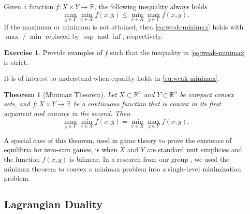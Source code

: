 \documentclass[
]{book}
\newtheorem{theorem}{Theorem}[chapter]
\theoremstyle{definition}
\theoremstyle{definition}
\theoremstyle{definition}
\newtheorem{exercise}{Exercise}[chapter]
\theoremstyle{definition}
\theoremstyle{remark}
\begin{document}
Given a function \(f: X \times Y \rightarrow \mathbb{R}^{}\), the following inequality always holds
\begin{equation}
\max_{y \in Y} \min_{x \in X} f(x,y) \leq \min_{x \in X} \max_{y \in Y} f(x,y).
\label{eq:weak-minimax}
\end{equation}
If the maximum or minimum is not attained, then \eqref{eq:weak-minimax} holds with \(\max\) / \(\min\) replaced by \(\sup\) and \(\inf\), respectively.

\begin{exercise}
Provide examples of \(f\) such that the inequality in \eqref{eq:weak-minimax} is strict.
\end{exercise}

It is of interest to understand when equality holds in \eqref{eq:weak-minimax}.

\begin{theorem}[Minimax Theorem]
\protect\hypertarget{thm:minimax}{}\label{thm:minimax}Let \(X \subset \mathbb{R}^{n}\) and \(Y \subset \mathbb{R}^{n}\) be compact convex sets, and \(f: X \times Y \rightarrow \mathbb{R}^{}\) be a continuous function that is convex in its first argument and concave in the second. Then
\[
\max_{y \in Y} \min_{x \in X} f(x,y) = \min_{x \in X} \max_{y \in Y} f(x,y).
\]
\end{theorem}

A special case of this theorem, used in game theory to prove the existence of equilibria for zero-sum games, is when \(X\) and \(Y\) are standard unit simplicies and the function \(f(x,y)\) is bilinear. In a research from our group \citep{tang23arxiv-uncertainty}, we used the minimax theorem to convex a minimax problem into a single-level minimization problem.

\hypertarget{lagrangian-duality}{%
\subsection{Lagrangian Duality}\label{lagrangian-duality}}
\end{document}
